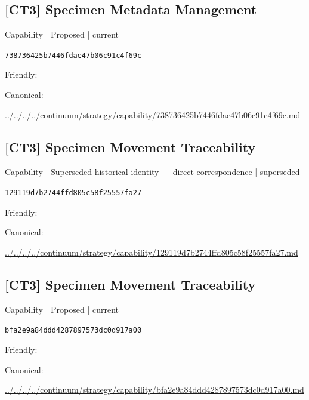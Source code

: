 \documentclass[10pt,a4paper]{article}
\begin{document}
\subsection*{[CT3] Specimen Metadata Management}
{\small Capability | Proposed | current}\par
\texttt{738736425b7446fdae47b06c91c4f69c}\par
Friendly: \par
Canonical: \par
{\footnotesize\url{../../../../continuum/strategy/capability/738736425b7446fdae47b06c91c4f69c.md}}\par
\subsection*{[CT3] Specimen Movement Traceability}
{\small Capability | Superseded historical identity — direct correspondence | superseded}\par
\texttt{129119d7b2744ffd805c58f25557fa27}\par
Friendly: \par
Canonical: \par
{\footnotesize\url{../../../../continuum/strategy/capability/129119d7b2744ffd805c58f25557fa27.md}}\par
\subsection*{[CT3] Specimen Movement Traceability}
{\small Capability | Proposed | current}\par
\texttt{bfa2e9a84ddd4287897573dc0d917a00}\par
Friendly: \par
Canonical: \par
{\footnotesize\url{../../../../continuum/strategy/capability/bfa2e9a84ddd4287897573dc0d917a00.md}}\par
\end{document}
